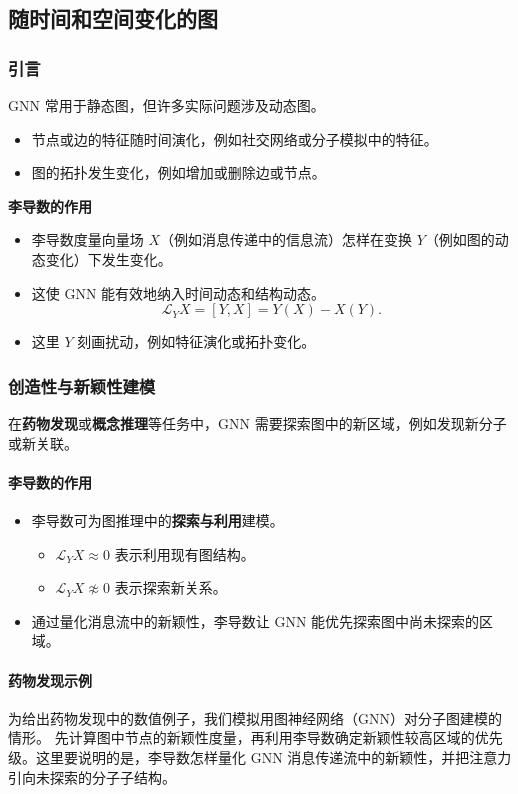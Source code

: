 \subsection{随时间和空间变化的图}
\subsubsection{引言}
GNN 常用于静态图，但许多实际问题涉及动态图。
\begin{itemize}
  \item 节点或边的特征随时间演化，例如社交网络或分子模拟中的特征。
  \item 图的拓扑发生变化，例如增加或删除边或节点。
\end{itemize}

\textbf{李导数的作用}
\begin{itemize}
  \item 李导数度量向量场 $X$（例如消息传递中的信息流）怎样在变换 $Y$（例如图的动态变化）下发生变化。
  \item 这使 GNN 能有效地纳入时间动态和结构动态。
  \[
    \mathcal L_Y X=[Y,X]=Y(X)-X(Y).
  \]
  \item 这里 $Y$ 刻画扰动，例如特征演化或拓扑变化。
\end{itemize}

\subsubsection{创造性与新颖性建模}
在\textbf{药物发现}或\textbf{概念推理}等任务中，GNN 需要探索图中的新区域，例如发现新分子或新关联。

\paragraph{李导数的作用}
\begin{itemize}
  \item 李导数可为图推理中的\textbf{探索与利用}建模。
  \begin{itemize}
    \item $\mathcal L_YX\approx0$ 表示利用现有图结构。
    \item $\mathcal L_YX\not\approx0$ 表示探索新关系。
  \end{itemize}
  \item 通过量化消息流中的新颖性，李导数让 GNN 能优先探索图中尚未探索的区域。
\end{itemize}

\paragraph{药物发现示例}
为给出药物发现中的数值例子，我们模拟用图神经网络（GNN）对分子图建模的情形。
先计算图中节点的新颖性度量，再利用李导数确定新颖性较高区域的优先级。这里要说明的是，李导数怎样量化 GNN 消息传递流中的新颖性，并把注意力引向未探索的分子子结构。

